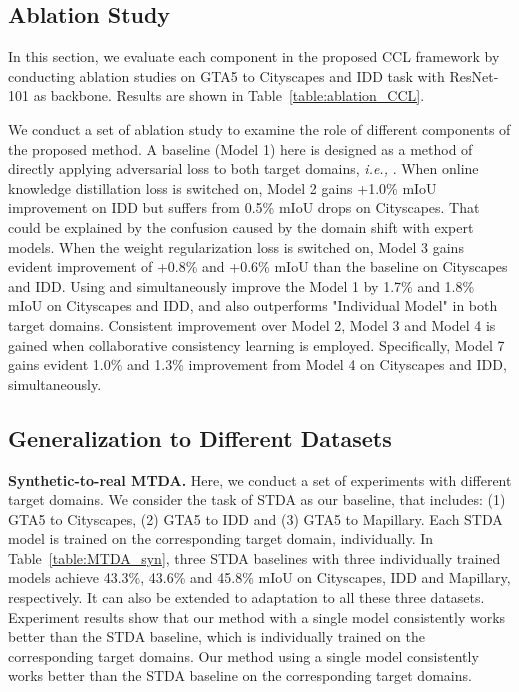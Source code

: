 \subsection{Ablation Study}
In this section, we evaluate each component in the proposed CCL framework by conducting ablation studies on GTA5 to Cityscapes and IDD task with ResNet-101 as backbone. Results are shown in Table~\ref{table:ablation_CCL}.

We conduct a set of ablation study to examine the role of different components of the proposed method. A baseline (Model 1) here is designed as a method of directly applying adversarial loss to both target domains, \textit{i.e.,} . When online knowledge distillation loss  is switched on, Model 2 gains +1.0\% mIoU improvement on IDD but suffers from 0.5\% mIoU drops on Cityscapes. That could be explained by the confusion caused by the domain shift with expert models. When the weight regularization loss  is switched on, Model 3 gains evident improvement of +0.8\% and +0.6\% mIoU than the baseline on Cityscapes and IDD. Using  and  simultaneously improve the Model 1 by 1.7\% and 1.8\% mIoU on Cityscapes and IDD, and also outperforms "Individual Model" in both target domains. Consistent improvement over Model 2, Model 3 and Model 4 is gained when collaborative consistency learning is employed. Specifically, Model 7 gains evident 1.0\% and 1.3\% improvement from Model 4 on Cityscapes and IDD, simultaneously.


\subsection{Generalization to Different Datasets}
\textbf{Synthetic-to-real MTDA.}
Here, we conduct a set of experiments with different target domains. We consider the task of STDA as our baseline, that includes: (1) GTA5 to Cityscapes, (2) GTA5 to IDD and (3) GTA5 to Mapillary. Each STDA model is trained on the corresponding target domain, individually. In Table~\ref{table:MTDA_syn}, three STDA baselines with three individually trained models achieve 43.3\%, 43.6\% and 45.8\% mIoU on Cityscapes, IDD and Mapillary, respectively. It can also be extended to adaptation to all these three datasets. Experiment results show that our method with a single model consistently works better than the STDA baseline, which is individually trained on the corresponding target domains. Our method using a single model consistently works better than the STDA baseline on the corresponding target domains. 


